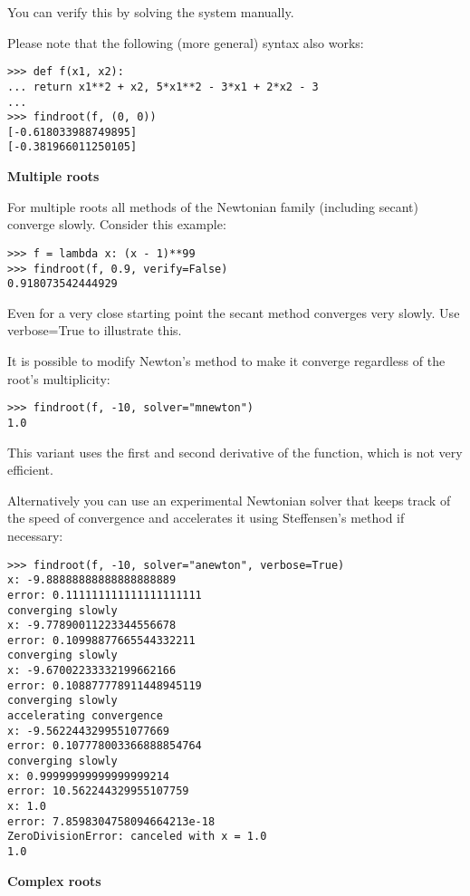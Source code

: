 You can verify this by solving the system manually.

Please note that the following (more general) syntax also works:

\begin{lstlisting}
>>> def f(x1, x2):
... return x1**2 + x2, 5*x1**2 - 3*x1 + 2*x2 - 3
...
>>> findroot(f, (0, 0))
[-0.618033988749895]
[-0.381966011250105]
\end{lstlisting}

\textbf{Multiple roots}

For multiple roots all methods of the Newtonian family (including secant) converge slowly. Consider this example:

\begin{lstlisting}
>>> f = lambda x: (x - 1)**99
>>> findroot(f, 0.9, verify=False)
0.918073542444929
\end{lstlisting}

Even for a very close starting point the secant method converges very slowly. Use verbose=True to illustrate this.

It is possible to modify Newton's method to make it converge regardless of the root's multiplicity:

\begin{lstlisting}
>>> findroot(f, -10, solver="mnewton")
1.0
\end{lstlisting}

This variant uses the first and second derivative of the function, which is not very efficient. 

Alternatively you can use an experimental Newtonian solver that keeps track of the speed of convergence and accelerates it using Steffensen's method if necessary:

\begin{lstlisting}
>>> findroot(f, -10, solver="anewton", verbose=True)
x: -9.88888888888888888889
error: 0.111111111111111111111
converging slowly
x: -9.77890011223344556678
error: 0.10998877665544332211
converging slowly
x: -9.67002233332199662166
error: 0.108877778911448945119
converging slowly
accelerating convergence
x: -9.5622443299551077669
error: 0.107778003366888854764
converging slowly
x: 0.99999999999999999214
error: 10.562244329955107759
x: 1.0
error: 7.8598304758094664213e-18
ZeroDivisionError: canceled with x = 1.0
1.0
\end{lstlisting}

\textbf{Complex roots}

